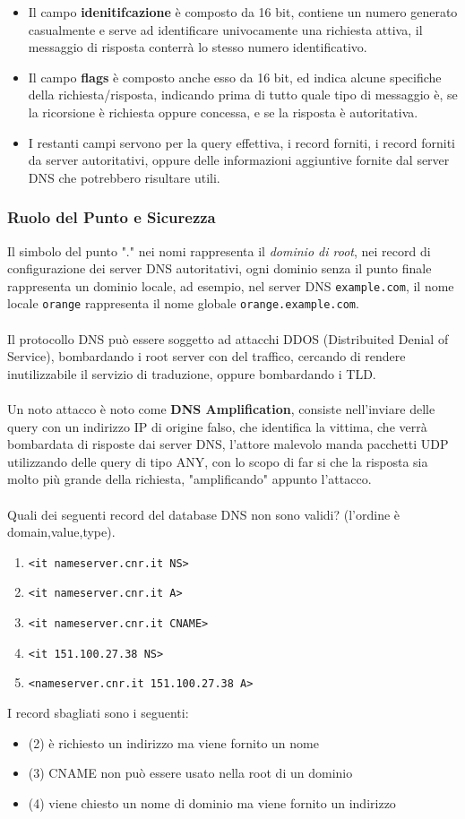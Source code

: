 \documentclass[12pt, letterpaper]{article}
\newcommand{\code}[1]{\colorbox{light-gray}{\texttt{#1}}}
\newcommand{\acc}{\\\hphantom{}\\}
\begin{document}
\begin{itemize}
    \item Il campo \textbf{idenitifcazione} è composto da 16 bit, contiene un numero generato casualmente 
    e serve ad identificare univocamente una richiesta attiva, il messaggio di risposta conterrà lo stesso 
    numero identificativo.
    \item Il campo \textbf{flags} è composto anche esso da 16 bit, ed indica alcune specifiche della 
    richiesta/risposta, indicando prima di tutto quale  tipo di messaggio è, se la ricorsione è richiesta 
    oppure concessa, e se la risposta è autoritativa. 
    \item I restanti campi servono per la query effettiva, i record forniti, i record forniti da server 
    autoritativi, oppure delle informazioni aggiuntive fornite dal server DNS che potrebbero risultare utili.
\end{itemize}
\subsubsection{Ruolo del Punto e Sicurezza}
Il simbolo del punto "." nei nomi rappresenta il \textit{dominio di root}, nei record di configurazione 
dei server DNS autoritativi, ogni dominio senza il punto finale rappresenta un dominio locale, ad esempio, 
nel server DNS \code{example.com}, il nome locale \code{orange} rappresenta il nome 
globale \code{orange.example.com}.\acc 
Il protocollo DNS può essere soggetto ad attacchi DDOS (Distribuited Denial of Service), bombardando i 
root server con del traffico, cercando di rendere inutilizzabile il servizio di traduzione, oppure 
bombardando i TLD.\acc 
Un noto attacco è noto come \textbf{DNS Amplification}, consiste nell'inviare delle query con un indirizzo 
IP di origine falso, che identifica la vittima, che verrà bombardata di risposte dai server DNS, l'attore malevolo 
manda pacchetti UDP utilizzando delle query di tipo ANY, con lo scopo di far si che la risposta sia 
molto più grande della richiesta, "amplificando" appunto l'attacco.\acc
    Quali dei seguenti record del database DNS non sono validi? (l'ordine è domain,value,type).\begin{enumerate}
        \item \code{<it nameserver.cnr.it NS>}
        \item \code{<it nameserver.cnr.it A>}
        \item \code{<it nameserver.cnr.it CNAME>}
        \item \code{<it 151.100.27.38 NS>}
        \item \code{<nameserver.cnr.it 151.100.27.38 A>}
    \end{enumerate}
I record sbagliati sono i seguenti:\begin{itemize}
    \item \color{red}(2) \color{black} è richiesto un indirizzo ma viene fornito un nome 
    \item  \color{red}(3) \color{black} CNAME non può essere usato nella root di un dominio 
    \item \color{red}(4) \color{black} viene chiesto un nome di dominio ma viene fornito un indirizzo
\end{itemize}
\end{document}
